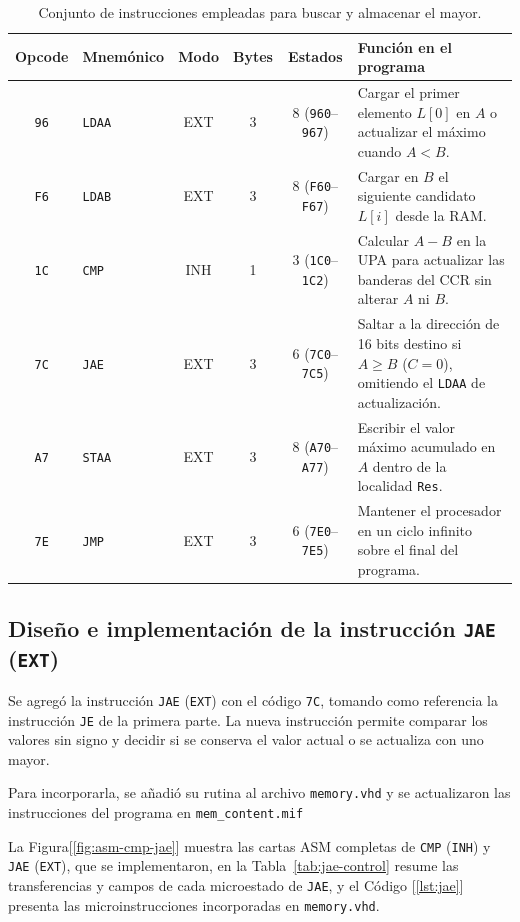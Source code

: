 \documentclass[letterpaper,12pt]{article}
\newcommand{\hx}[1]{\texttt{#1}}
\begin{document}
\begin{table}[H]
\centering
\scriptsize
\caption{Conjunto de instrucciones empleadas para buscar y almacenar el mayor.}
\label{tab:instrucciones}
\begin{tabularx}{\linewidth}{c l c c c Y}
\toprule
Opcode & Mnemónico & Modo & Bytes & Estados & Función en el programa \\
\midrule
\hx{96} & \texttt{LDAA} & EXT & 3 & 8 (\hx{960}--\hx{967}) & Cargar el primer elemento $L[0]$ en $A$ o actualizar el máximo cuando $A < B$. \\
\hx{F6} & \texttt{LDAB} & EXT & 3 & 8 (\hx{F60}--\hx{F67}) & Cargar en $B$ el siguiente candidato $L[i]$ desde la RAM. \\
\hx{1C} & \texttt{CMP}  & INH & 1 & 3 (\hx{1C0}--\hx{1C2}) & Calcular $A-B$ en la UPA para actualizar las banderas del CCR sin alterar $A$ ni $B$. \\
\hx{7C} & \texttt{JAE}  & EXT & 3 & 6 (\hx{7C0}--\hx{7C5}) & Saltar a la dirección de 16 bits destino si $A \ge B$ ($C=0$), omitiendo el \texttt{LDAA} de actualización. \\
\hx{A7} & \texttt{STAA} & EXT & 3 & 8 (\hx{A70}--\hx{A77}) & Escribir el valor máximo acumulado en $A$ dentro de la localidad \texttt{Res}. \\
\hx{7E} & \texttt{JMP}  & EXT & 3 & 6 (\hx{7E0}--\hx{7E5}) & Mantener el procesador en un ciclo infinito sobre el final del programa. \\
\bottomrule
\end{tabularx}
\end{table}

\subsection{Diseño e implementación de la instrucción \texttt{JAE} (\texttt{EXT})}

Se agregó la instrucción \texttt{JAE} (\texttt{EXT}) con el código \hx{7C}, tomando como referencia la instrucción \texttt{JE} de la primera parte. La nueva instrucción permite comparar los valores sin signo y decidir si se conserva el valor actual o se actualiza con uno mayor.

Para incorporarla, se añadió su rutina al archivo \texttt{memory.vhd} y se actualizaron las instrucciones del programa en \texttt{mem\_content.mif}

La Figura[\ref{fig:asm-cmp-jae}] muestra las cartas ASM completas de \texttt{CMP} (\texttt{INH}) y \texttt{JAE} (\texttt{EXT}), que se implementaron, en la Tabla~\ref{tab:jae-control} resume las transferencias y campos de cada microestado de \texttt{JAE}, y el Código [\ref{lst:jae}] presenta las microinstrucciones incorporadas en \texttt{memory.vhd}.
\end{document}
